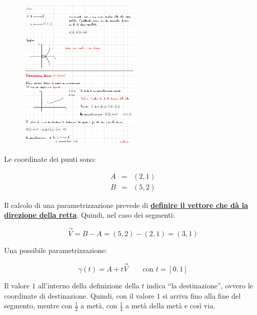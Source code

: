 \documentclass[a4paper]{article}
\newcommand{\dquotes}[1]{``#1''}
\begin{document}
	\begin{figure}[!htp]
		\centering
		\includegraphics[width=0.5\textwidth]{img/parametrizzazioni_notevoli_segmento.pdf}
	\end{figure}

	\noindent
	Le coordinate dei punti sono:
	
	\begin{equation*}
		\begin{array}{lll}
			A & = & \left(2,1\right) \\
			B & = & \left(5,2\right)
		\end{array}
	\end{equation*}

	\noindent
	Il calcolo di una parametrizzazione prevede di \textcolor{Red3}{\textbf{\underline{definire il vettore che dà la}}} \textcolor{Red3}{\textbf{\underline{direzione della retta}}}. Quindi, nel caso dei segmenti:
	
	\begin{equation*}
		\overrightarrow{V} = B - A = \left(5,2\right) - \left(2,1\right) = \left(3,1\right)
	\end{equation*}

	\noindent
	Una possibile parametrizzazione:
	
	\begin{equation*}
		\gamma\left(t\right) = A + t\overrightarrow{V} \hspace{2em} \text{con } t = \left[0,1\right]
	\end{equation*}

	\noindent
	Il valore $1$ all'interno della definizione della $t$ indica \dquotes{la destinazione}, ovvero le coordinate di destinazione. Quindi, con il valore $1$ si arriva fino alla fine del segmento, mentre con $\frac{1}{2}$ a metà, con $\frac{1}{4}$ a metà della metà e così via.
	
\end{document}
